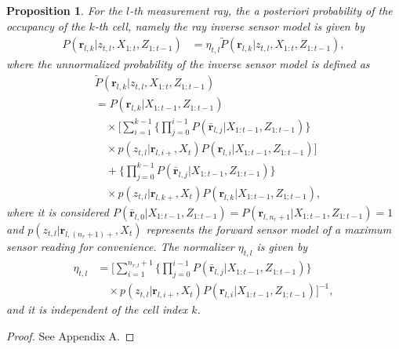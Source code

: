 \documentclass[letterpaper, 10pt, conference]{ieeeconf}
\newtheorem{prop}{Proposition}
\begin{document}
\begin{prop}
For the $l$-th measurement ray, the a posteriori probability of the occupancy of the $k$-th cell, namely the ray inverse sensor model is given by
\begin{align}
\label{eqn:RayISMAnswer}
P(\mathbf{r}_{l,k}|z_{t,l},X_{1:t},Z_{1:t-1})&=\eta_{t,l}\tilde P(\mathbf{r}_{l,k}|z_{t,l},X_{1:t},Z_{1:t-1}),
\end{align}
where the unnormalized probability of the inverse sensor model is defined as
\begin{align}
\label{eqn:Unnormalized}
& \tilde P(\mathbf{r}_{l,k}|z_{t,l},X_{1:t},Z_{1:t-1})\nonumber\\
&=P(\mathbf{r}_{l,k}|X_{1:t-1},Z_{1:t-1})\nonumber\\
&\quad\times 
\bigg[\sum_{i=1}^{k-1}\bigg\{\prod_{j=0}^{i-1}P(\bar{\mathbf{r}}_{l,j}|X_{1:t-1},Z_{1:t-1})\bigg\}\nonumber\\
&\quad\times p(z_{t,l}|\mathbf{r}_{l,i+},X_t)P(\mathbf{r}_{l,i}|X_{1:t-1},Z_{1:t-1})\bigg]\nonumber\\
&\quad + \bigg\{\prod_{j=0}^{k-1}P(\bar{\mathbf{r}}_{l,j}|X_{1:t-1},Z_{1:t-1})\bigg\}\nonumber\\
&\quad\times p(z_{t,l}|\mathbf{r}_{l,k+},X_t)P(\mathbf{r}_{l,k}|X_{1:t-1},Z_{1:t-1}),
\end{align}
where it is considered $P(\bar{\mathbf{r}}_{l,0}|X_{1:t-1},Z_{1:t-1})=P(\mathbf{r}_{l,n_r+1}|X_{1:t-1},Z_{1:t-1})=1$ and $p(z_{t,l}|\mathbf{r}_{l,(n_r+1)+},X_t)$ represents the forward sensor model of a maximum sensor reading for convenience. The normalizer $\eta_{t,l}$ is given by
\begin{align}
\label{eqn:allEta}
\eta_{t,l}
&=
\bigg[\sum_{i=1}^{n_{r,l}+1}\bigg\{\prod_{j=0}^{i-1}P(\bar{\mathbf{r}}_{l,j}|X_{1:t-1},Z_{1:t-1})\bigg\}\nonumber\\&\quad\times p(z_{t,l}|\mathbf{r}_{l,i+},X_t)P(\mathbf{r}_{l,i}|X_{1:t-1},Z_{1:t-1})\bigg]^{-1},
\end{align}
and it is independent of the cell index $k$.
\end{prop}
\begin{proof}
See Appendix A.
\end{proof}
\end{document}
